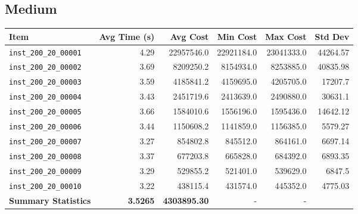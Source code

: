 \documentclass{article}
\begin{document}
\subsection*{Medium}
\begin{table}[H]
	\centering 
	\begin{tabular}{lrrrrr} 
		\toprule 
		\textbf{Item} & \textbf{Avg Time (s)} & \textbf{Avg Cost} & \textbf{Min Cost} & \textbf{Max Cost} & \textbf{Std Dev} \\
		\midrule 
		\texttt{inst\_200\_20\_00001} & 4.29 & 22957546.0 & 22921184.0 & 23041333.0 & 44264.57 \\ \texttt{inst\_200\_20\_00002} & 3.69 & 8209250.2 & 8154934.0 & 8253885.0 & 40835.98 \\ \texttt{inst\_200\_20\_00003} & 3.59 & 4185841.2 & 4159695.0 & 4205705.0 & 17207.7 \\ \texttt{inst\_200\_20\_00004} & 3.43 & 2451719.6 & 2413639.0 & 2490880.0 & 30631.1 \\ \texttt{inst\_200\_20\_00005} & 3.66 & 1584010.6 & 1556196.0 & 1595436.0 & 14642.12 \\ \texttt{inst\_200\_20\_00006} & 3.44 & 1150608.2 & 1141859.0 & 1156385.0 & 5579.27 \\ \texttt{inst\_200\_20\_00007} & 3.27 & 854802.8 & 845512.0 & 864161.0 & 6697.14 \\ \texttt{inst\_200\_20\_00008} & 3.37 & 677203.8 & 665828.0 & 684392.0 & 6893.35 \\ \texttt{inst\_200\_20\_00009} & 3.29 & 529855.2 & 521401.0 & 539629.0 & 6847.5 \\ \texttt{inst\_200\_20\_00010} & 3.22 & 438115.4 & 431574.0 & 445352.0 & 4775.03 \\
		\midrule 
		\textbf{Summary Statistics} & \textbf{3.5265} & \textbf{4303895.30} & - & - \\ 
		\bottomrule
	\end{tabular}
	\label{tab:performance_metrics_medium_grasp}
\end{table}
\end{document}
